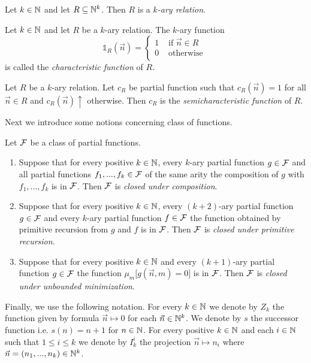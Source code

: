 \documentclass[10pt]{amsart}
\begin{document}
\begin{definition}
	Let $k\in {\mathbb N}$ and let $R\subseteq {\mathbb N}^k$. Then $R$ is a \textit{$k$-ary relation}.
\end{definition}

\begin{definition}
	Let $k \in {\mathbb N}$ and let $R$ be a $k$-ary relation. The $k$-ary function
	$$
		\mathbb{1}_R\left(\vec{n}\right) = \begin{cases}
			1 & \mbox{ if }\vec{n} \in R \\
			0 & \mbox{ otherwise }       \\
		\end{cases}
	$$
	is called the \textit{characteristic function} of $R$.
\end{definition}

\begin{definition}
	Let $R$ be a $k$-ary relation. Let $c_R$ be partial function such that $c_R(\vec{n}) = 1$ for all $\vec{n} \in R$ and $c_R(\vec{n})\uparrow$ otherwise. Then $c_R$ is the \textit{semicharacteristic function} of $R$.
\end{definition}
\noindent
Next we introduce some notions concerning class of functions.

\begin{definition}
	Let ${\mathcal F}$ be a class of partial functions.
	\begin{enumerate}[label=\textbf{(\arabic*)}, leftmargin=3.0em]
		\item Suppose that for every positive $k \in {\mathbb N}$, every $k$-ary partial function $g \in {\mathcal F}$ and all partial functions $f_1,...,f_k\in {\mathcal F}$ of the same arity the composition of $g$ with $f_1,...,f_k$ is in ${\mathcal F}$. Then ${\mathcal F}$ is \textit{closed under composition}.
		\item Suppose that for every positive $k \in {\mathbb N}$, every $(k+2)$-ary partial function $g\in {\mathcal F}$ and every $k$-ary partial function $f\in {\mathcal F}$ the function obtained by primitive recursion from $g$ and $f$ is in ${\mathcal F}$. Then ${\mathcal F}$ is \textit{closed under primitive recursion}.
		\item Suppose that for every positive $k \in {\mathbb N}$ and every $(k+1)$-ary partial function $g\in {\mathcal F}$ the function $\mu_m\big[g(\vec{n},m) = 0\big]$ is in ${\mathcal F}$. Then ${\mathcal F}$ is \textit{closed under unbounded minimization}.
	\end{enumerate}
\end{definition}
\noindent
Finally, we use the following notation. For every $k \in {\mathbb N}$ we denote by $Z_k$ the function given by formula $\vec{n} \mapsto 0$ for each $\vec{n} \in {\mathbb N}^k$. We denote by $s$ the successor function i.e. $s(n) = n + 1$ for $n \in {\mathbb N}$. For every positive $k \in {\mathbb N}$ and each $i \in {\mathbb N}$ such that $1\leq i \leq k$ we denote by $I^i_k$ the projection $\vec{n} \mapsto n_i$ where $\vec{n} = \left(n_1,...,n_k\right) \in {\mathbb N}^k$.
\end{document}
